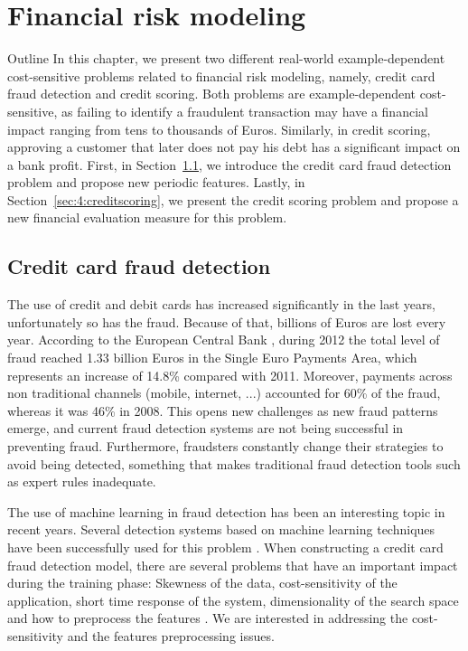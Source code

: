 \chapter{Financial risk modeling}\label{ch:4}

\begin{remark}{Outline}
In this chapter, we present two different real-world example-dependent 
cost-sensitive problems related to financial risk modeling, namely, credit card fraud detection and 
credit scoring. Both problems are example-dependent cost-sensitive, as failing to identify a 
fraudulent transaction may have a financial impact ranging from tens to thousands of Euros. 
Similarly, in credit scoring, approving a customer that later does not pay his debt has a 
significant impact on a bank profit. First, in Section~\ref{sec:4:fraud},  we introduce the credit 
card fraud detection problem and propose new periodic features.  Lastly, in 
Section~\ref{sec:4:creditscoring}, we present the credit scoring problem and propose a new 
financial evaluation measure for this problem.
\end{remark}

\section{Credit card fraud detection}
\label{sec:4:fraud}

  The use of credit and debit cards has increased significantly   in the last years, unfortunately 
  so has the fraud. Because of that, billions of Euros are lost every year. According to 
  the European Central Bank \citep{EuropeanCentralBank2013}, during 2012 the total level of fraud 
  reached 1.33 billion Euros in the Single Euro Payments Area, which represents an increase of 
  14.8\% compared with 2011. Moreover, payments across non traditional channels (mobile, internet, 
  ...) accounted for 60\% of the fraud, whereas it was 46\% in 2008. This opens new challenges as 
  new fraud patterns emerge, and current fraud detection systems are not being successful in 
  preventing fraud. Furthermore, fraudsters constantly change their strategies to avoid being 
  detected, something that makes traditional fraud detection tools such as expert rules inadequate.
  
  The use of machine learning in fraud detection has been an interesting topic in recent years. 
  Several detection systems based on machine learning techniques have been successfully used 
  for this problem \citep{Bhattacharyya2011}. When constructing a credit card fraud detection 
  model, there are several problems that have an important impact during the training phase: 
  Skewness of the data, cost-sensitivity of the application, short time response of the system, 
  dimensionality  of the search space and how to preprocess the features
  \citep{Bolton2002,Gadi2008,Whitrow2008,DalPozzolo2014,VanVlasselaer2015a}.  We are interested 
  in addressing the cost-sensitivity and the features preprocessing   issues. 
  
